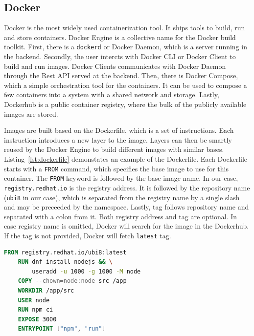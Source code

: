 \subsection{Docker}
    
Docker is the most widely used containerization tool. It ships tools to build, run and store containers. Docker Engine is a collective name for the Docker build toolkit. First, there is a \lstinline{dockerd} or Docker Daemon, which is a server running in the backend. Secondly, the user intercts with Docker CLI or Docker Client to build and run images. Docker Clients communicates with Docker Daemon through the Rest API served at the backend. Then, there is Docker Compose, which a simple orchestration tool for the containers. It can be used to compose a few containers into a system with a shared network and storage. Lastly, Dockerhub is a public container registry, where the bulk of the publicly available images are stored.

Images are built based on the Dockerfile, which is a set of instructions. Each instruction introduces a new layer to the image. Layers can then be smartly reused by the Docker Engine to build different images with similar bases. Listing~\ref{lst:dockerfile} demonstates an example of the Dockerfile. Each Dockerfile starts with a \lstinline{FROM} command, which specifies the base image to use for this container. The \lstinline{FROM} keyword is followed by the base image name. In our case, \lstinline{registry.redhat.io} is the registry address. It is followed by the repository name (\lstinline{ubi8} in our case), which is separated from the registry name by a single slash and may be preceeded by the namespace. Lastly, tag follows repository name and separated with a colon from it. Both registry address and tag are optional. In case registry name is omitted, Docker will search for the image in the Dockerhub. If the tag is not provided, Docker will fetch \lstinline{latest} tag.

\begin{lstlisting}[language=Dockerfile, caption={A simple Dockerfile for a NodeJS app.}, label={lst:dockerfile}]
    FROM registry.redhat.io/ubi8:latest
    RUN dnf install nodejs && \
        useradd -u 1000 -g 1000 -M node
    COPY --chown=node:node src /app
    WORKDIR /app/src
    USER node
    RUN npm ci
    EXPOSE 3000
    ENTRYPOINT ["npm", "run"]
\end{lstlisting}

